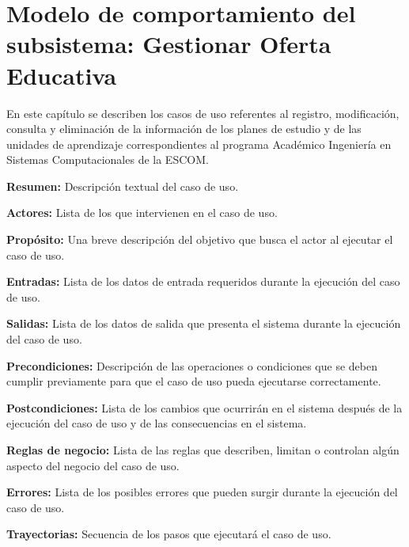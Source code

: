 
\chapter{Modelo de comportamiento del subsistema: Gestionar Oferta Educativa
\label{chp:gestionarAcademias}}

En este capítulo se describen los casos de uso referentes al registro, modificación, consulta y eliminación de la información de los planes de estudio y de las unidades de aprendizaje correspondientes al programa Académico Ingeniería en Sistemas Computacionales de la ESCOM. \bigskip

     \begin{objetivos}
	\item {\bf Resumen:} Descripción textual del caso de uso.
	\item {\bf Actores:} Lista de los 
	 que intervienen en el caso de uso.
	\item {\bf Propósito:} Una breve descripción del objetivo que busca el actor al ejecutar el caso de uso.
	\item {\bf Entradas:} Lista de los datos de entrada requeridos durante la ejecución del caso de uso.
	\item {\bf Salidas:} Lista de los datos de salida que presenta el sistema durante la ejecución del caso de uso.
	\item {\bf Precondiciones:} Descripción de las operaciones o condiciones que se deben cumplir previamente para que el caso de uso pueda ejecutarse correctamente.
	\item {\bf Postcondiciones:} Lista de los cambios que ocurrirán en el sistema después de la ejecución del caso de uso y de las consecuencias en el sistema.
	\item {\bf Reglas de negocio:} Lista de las reglas que describen, limitan o controlan algún aspecto del negocio del caso de uso.
	\item {\bf Errores:} Lista de los posibles errores que pueden surgir durante la ejecución del caso de uso.
	\item {\bf Trayectorias:} Secuencia de los pasos que ejecutará el caso de uso.
    \end{objetivos}

	
	
